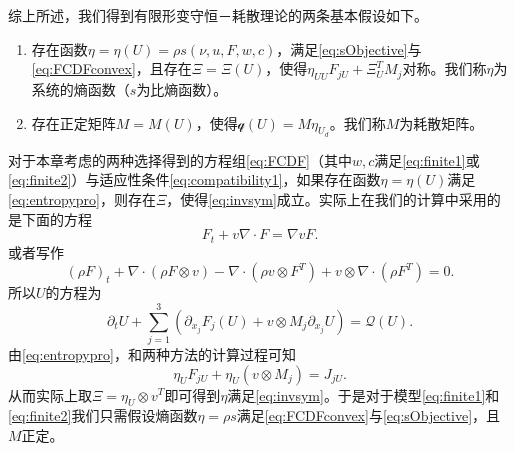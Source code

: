 综上所述，我们得到有限形变守恒－耗散理论的两条基本假设如下。
\begin{enumerate}
		\item 存在函数$\eta = \eta (U) = \rho s(\nu,u,F,w,c)$，满足\eqref{eq:sObjective}与\eqref{eq:FCDFconvex}，且存在$\Xi=\Xi(U)$，使得$\eta_{UU} F_{jU} + \Xi_U^T M_j $对称。我们称$\eta$为系统的熵函数（$s$为比熵函数）。
		\item 存在正定矩阵$M = M(U)$，使得$\mathcal{q}(U) = M \eta_{U_d}$。我们称$M$为耗散矩阵。
\end{enumerate}

对于本章考虑的两种选择得到的方程组\eqref{eq:FCDF}（其中$w,c$满足\eqref{eq:finite1}或\eqref{eq:finite2}）与适应性条件\eqref{eq:compatibility1}，如果存在函数$\eta = \eta(U)$满足\eqref{eq:entropypro}，则存在$\Xi$，使得\eqref{eq:invsym}成立。实际上在我们的计算中采用的是下面的方程
\begin{equation*}
	F_t + v \nabla \cdot F = \nabla v F.
\end{equation*}
或者写作
\begin{equation*}
(\rho F)_t + \nabla \cdot (\rho F \otimes v) - \nabla \cdot (\rho v \otimes F^T) + v \otimes \nabla \cdot (\rho F^T) = 0 .
\end{equation*}
所以$U$的方程为
\begin{equation*}
	\partial_t U + \sum_{j=1}^3 (\partial_{x_j} F_j(U) + v\otimes M_j \partial_{x_j} U)= \mathcal{Q} (U) .
\end{equation*}
由\eqref{eq:entropypro}，和两种方法的计算过程可知
\begin{equation*}
	\eta_U F_{jU} + \eta_{U} (v \otimes M_{j}) = J_{jU}.
\end{equation*}
从而实际上取$\Xi = \eta_U \otimes v^T$即可得到$\eta$满足\eqref{eq:invsym}。于是对于模型\eqref{eq:finite1}和\eqref{eq:finite2}我们只需假设熵函数$\eta = \rho s$满足\eqref{eq:FCDFconvex}与\eqref{eq:sObjective}，且$M$正定。

